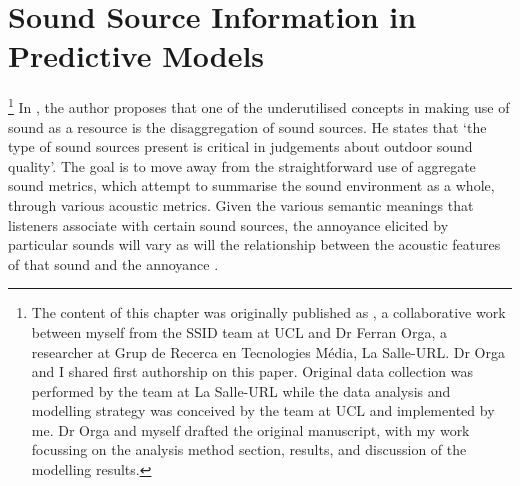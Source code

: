\chapter{Sound Source Information in Predictive Models}
\label{ch:mlmann}



\footnote{The content of this chapter was originally published as \citet{Orga2021Multilevel}, a collaborative work between myself from the SSID team at UCL and Dr Ferran Orga, a researcher at Grup de Recerca en Tecnologies M{\'e}dia, La Salle-URL. Dr Orga and I shared first authorship on this paper. Original data collection was performed by the team at La Salle-URL while the data analysis and modelling strategy was conceived by the team at UCL and implemented by me. Dr Orga and myself drafted the original manuscript, with my work focussing on the analysis method section, results, and discussion of the modelling results.} In \citet{Brown2009acoustic}, the author proposes that one of the underutilised concepts in making use of sound as a resource is the disaggregation of sound sources. He states that `the type of sound sources present is critical in judgements about outdoor sound quality'. The goal is to move away from the straightforward use of aggregate sound metrics, which attempt to summarise the sound environment as a whole, through various acoustic metrics. Given the various semantic meanings that listeners associate with certain sound sources, the annoyance elicited by particular sounds will vary as will the relationship between the acoustic features of that sound and the annoyance \citep{LafayInvestigating}.

